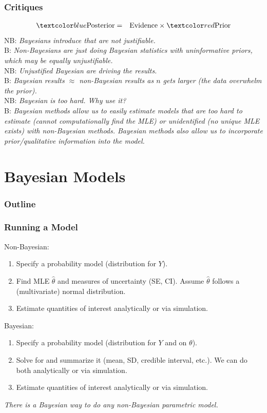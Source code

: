 \documentclass{beamer}
\begin{document}
\begin{frame}
\frametitle{Critiques}
\pause
\begin{eqnarray*}
\blue{\mathrm{Posterior}} &=& \mathrm{Evidence} \times \red{\mathrm{Prior}}
\end{eqnarray*}
\pause
NB: {\it Bayesians introduce  that are not justifiable.} \\
\pause
\footnotesize B: \emph{Non-Bayesians are just doing Bayesian statistics with uninformative
priors, which may be equally unjustifiable.} \\
\bigskip
\pause
\normalsize
NB: {\it Unjustified Bayesian  are driving the results.} \\
\pause
\footnotesize
B: \emph{Bayesian results $\approx$ non-Bayesian results as $n$ gets larger
(the data overwhelm the prior).} \\
\pause
\bigskip
\normalsize
NB: {\it Bayesian is too hard.  Why use it?} \\
\pause
\footnotesize
B: \emph{Bayesian methods allow us to easily estimate models that are too hard to
estimate (cannot computationally find the MLE) or unidentified (no unique MLE
exists) with non-Bayesian methods. \pause Bayesian methods also allow us to
incorporate prior/qualitative information into the model.}  
\normalsize
\end{frame}

\section{Bayesian Models}

\begin{frame}
\frametitle{Outline}
\tableofcontents[currentsection]
\end{frame}

\begin{frame}
\frametitle{Running a Model}
\pause
\begin{multicols}{2}
Non-Bayesian:
\pause
\begin{enumerate}
\item Specify a probability model (distribution for $Y$).
\pause
\item Find MLE $\hat{\theta}$ and measures of uncertainty (SE, CI).  Assume $\hat{\theta}$ follows a (multivariate) normal distribution.
\pause
\item Estimate quantities of interest analytically or via simulation.
\end{enumerate}
\newpage
\pause
Bayesian:
\begin{enumerate}
\item Specify a probability model (distribution for $Y$ and  on
$\theta$).
\pause
\item Solve for  and summarize it (mean, SD, credible
interval, etc.).  We can do both analytically or via simulation.
\pause
\item Estimate quantities of interest analytically or via simulation.
\end{enumerate}
\end{multicols}
\emph{There is a Bayesian way to do any non-Bayesian
parametric model.}
\end{frame}
\end{document}
